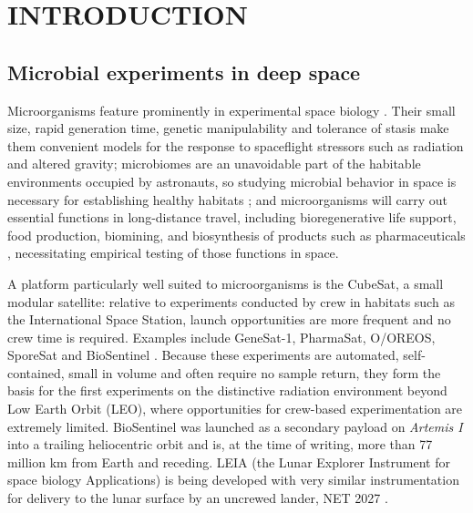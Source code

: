 \documentclass{asmarticle}
\begin{document}
\section{INTRODUCTION}

\subsection{Microbial experiments in deep space}
Microorganisms feature prominently in experimental space biology \cite{horneck2010space, nickerson2022vision, bijlani2021advances}. Their small size, rapid generation time, genetic manipulability and tolerance of stasis make them convenient models for the response to spaceflight stressors such as radiation and altered gravity; microbiomes are an unavoidable part of the habitable environments occupied by astronauts, so studying microbial behavior in space is necessary for establishing healthy habitats \cite{kumar2022metabolic, martin2017integrated, siddiqui2023microbiome}; and microorganisms will carry out essential functions in long-distance travel, including bioregenerative life support, food production, biomining, and biosynthesis of products such as pharmaceuticals \cite{dance2025microbes, santomartino2023toward, berliner2021towards, gumulya2022situ, mcnulty2021molecular}, necessitating empirical testing of those functions in space.

A platform particularly well suited to microorganisms is the CubeSat, a small modular satellite: relative to experiments conducted by crew in habitats such as the International Space Station, launch opportunities are more frequent and no crew time is required. Examples include GeneSat-1, PharmaSat, O/OREOS, SporeSat and BioSentinel \cite{santa2023microbial,massaro2023biosentinel}. Because these experiments are automated, self-contained, small in volume and often require no sample return, they form the basis for the first experiments on the distinctive radiation environment beyond Low Earth Orbit (LEO), where opportunities for crew-based experimentation are extremely limited. BioSentinel was launched as a secondary payload on \textit{Artemis I} into a trailing heliocentric orbit and is, at the time of writing, more than 77 million km from Earth and receding. LEIA (the Lunar Explorer Instrument for space biology Applications) is being developed with very similar instrumentation for delivery to the lunar surface by an uncrewed lander, NET 2027 \cite{lambacher2025leia, NASA_2023}.
\end{document}
